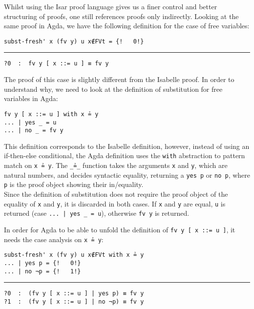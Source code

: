 \documentclass[a4paper, 12pt, twoside]{style/ociamthesis}
\let\OldTexttt\texttt
\renewcommand{\texttt}[1]{\small\OldTexttt{#1}}
\begin{document}
Whilst using the Isar proof language gives us a finer control and better
structuring of proofs, one still references proofs only indirectly.
Looking at the same proof in Agda, we have the following definition for
the case of free variables:

\begin{verbatim}
subst-fresh' x (fv y) u x∉FVt = {!   0!}
\end{verbatim}

\noindent\rule{8cm}{0.4pt}

\begin{verbatim}
?0  :  fv y [ x ::= u ] ≡ fv y
\end{verbatim}

The proof of this case is slightly different from the Isabelle proof. In
order to understand why, we need to look at the definition of
substitution for free variables in Agda:

\begin{verbatim}
fv y [ x ::= u ] with x ≟ y
... | yes _ = u
... | no _ = fv y
\end{verbatim}

This definition corresponds to the Isabelle definition, however, instead
of using an if-then-else conditional, the Agda definition uses the
\texttt{with} abstraction to pattern match on \texttt{x ≟ y}. The
\texttt{\_≟\_} function takes the arguments \texttt{x} and \texttt{y},
which are natural numbers, and decides syntactic equality, returning a
\texttt{yes p} or \texttt{no p}, where \texttt{p} is the proof object
showing their in/equality.\\
Since the definition of substitution does not require the proof object
of the equality of \texttt{x} and \texttt{y}, it is discarded in both
cases. If \texttt{x} and \texttt{y} are equal, \texttt{u} is returned
(case \texttt{... | yes \_ = u}), otherwise \texttt{fv y} is returned.

In order for Agda to be able to unfold the definition of
\texttt{fv y [ x ::= u ]}, it needs the case analysis on \texttt{x ≟ y}:

\begin{verbatim}
subst-fresh' x (fv y) u x∉FVt with x ≟ y
... | yes p = {!   0!}
... | no ¬p = {!   1!}
\end{verbatim}

\noindent\rule{8cm}{0.4pt}

\begin{verbatim}
?0  :  (fv y [ x ::= u ] | yes p) ≡ fv y
?1  :  (fv y [ x ::= u ] | no ¬p) ≡ fv y
\end{verbatim}
\end{document}
